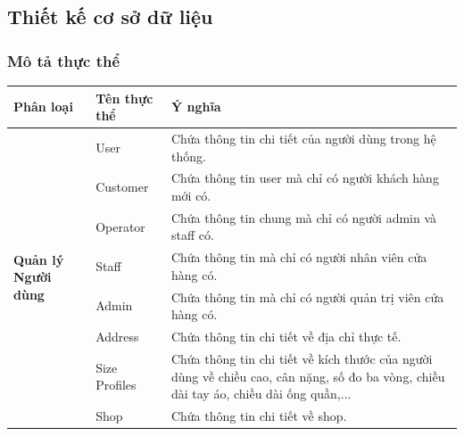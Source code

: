 \subsection{Thiết kế cơ sở dữ liệu}
\subsubsection{Mô tả thực thể}

\begin{table}[H]
	\centering
	\begin{tabular}{|m{3cm}|m{3.5cm}|m{9.5cm}|}
		\hline
		\textbf{Phân loại} & \textbf{Tên thực thể} & \textbf{Ý nghĩa}                                                                                                                     \\ \hline

		\multirow{8}{=}{\textbf{Quản lý Người dùng}}
		                   & User                  & Chứa thông tin chi tiết của người dùng trong hệ thống.                                                                               \\ \cline{2-3}
		                   & Customer              & Chứa thông tin user mà chỉ có người khách hàng mới có.                                                                               \\ \cline{2-3}
		                   & Operator              & Chứa thông tin chung mà chỉ có người admin và staff có.                                                                              \\ \cline{2-3}
		                   & Staff                 & Chứa thông tin mà chỉ có người nhân viên cửa hàng có.                                                                                \\ \cline{2-3}
		                   & Admin                 & Chứa thông tin mà chỉ có người quản trị viên cửa hàng có.                                                                            \\ \cline{2-3}
		                   & Address               & Chứa thông tin chi tiết về địa chỉ thực tế.                                                                                          \\ \cline{2-3}
		                   & Size Profiles         & Chứa thông tin chi tiết về kích thước của người dùng về chiều cao, cân nặng, số đo ba vòng, chiều dài tay áo, chiều dài ống quần,... \\
		\cline{2-3}
		                   & Shop                  & Chứa thông tin chi tiết về shop.                                                                                                     \\
		\hline


\end{tabular}
\end{table}
